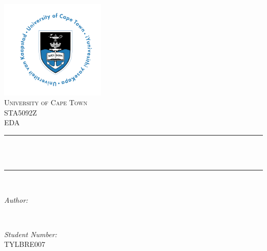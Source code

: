 \begin{titlepage}
	\centering
    \vspace*{0.5 cm}
    \includegraphics[width = 5cm]{UCT.jpg}\\[1.0 cm]	%
    \textsc{\LARGE University of Cape Town}\\[2.0 cm]	%
	\textsc{\Large STA5092Z}\\[0.5 cm]				%
	\textsc{\large EDA}\\[0.5 cm]				%
	\rule{\linewidth}{0.2 mm} \\[0.4 cm]
	{ \huge \bfseries \thetitle}\\
	\rule{\linewidth}{0.2 mm} \\[1.5 cm]
	
	\begin{minipage}{0.4\textwidth}
		\begin{flushleft} \large
			\emph{Author:}\\
			\theauthor
			\end{flushleft}
			\end{minipage}~
			\begin{minipage}{0.4\textwidth}
			\begin{flushright} \large
			\emph{Student Number:} \\
			TYLBRE007									%
		\end{flushright}
	\end{minipage}\\[2 cm]
	
	{\large \thedate}\\[2 cm]
 
	\vfill
	
\end{titlepage}